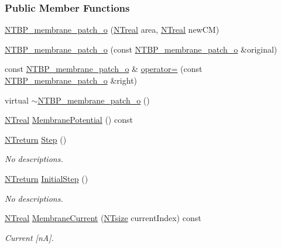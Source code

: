 \subsubsection*{Public Member Functions}
\begin{DoxyCompactItemize}
\item 
\hyperlink{class_n_t_b_p__membrane__patch__o_a47ed0ce9975ece138516bbd0836abba6}{NTBP\_\-membrane\_\-patch\_\-o} (\hyperlink{nt__types_8h_a814a97893e9deb1eedcc7604529ba80d}{NTreal} area, \hyperlink{nt__types_8h_a814a97893e9deb1eedcc7604529ba80d}{NTreal} newCM)
\item 
\hyperlink{class_n_t_b_p__membrane__patch__o_aa49f1f6f1aa0ce86dc25015b963a3da1}{NTBP\_\-membrane\_\-patch\_\-o} (const \hyperlink{class_n_t_b_p__membrane__patch__o}{NTBP\_\-membrane\_\-patch\_\-o} \&original)
\item 
const \hyperlink{class_n_t_b_p__membrane__patch__o}{NTBP\_\-membrane\_\-patch\_\-o} \& \hyperlink{class_n_t_b_p__membrane__patch__o_a6f386776c4bceff4311079c95685e762}{operator=} (const \hyperlink{class_n_t_b_p__membrane__patch__o}{NTBP\_\-membrane\_\-patch\_\-o} \&right)
\item 
virtual \hyperlink{class_n_t_b_p__membrane__patch__o_a879df23db2f57698db3d9854910a851b}{$\sim$NTBP\_\-membrane\_\-patch\_\-o} ()
\item 
\hyperlink{nt__types_8h_a814a97893e9deb1eedcc7604529ba80d}{NTreal} \hyperlink{class_n_t_b_p__membrane__patch__o_a9692bff4acbd0b1e7468a338620bd5d0}{MembranePotential} () const 
\item 
\hyperlink{nt__types_8h_ab9564ee8f091e809d21b8451c6683c53}{NTreturn} \hyperlink{class_n_t_b_p__membrane__patch__o_ae252091e5326872bbc9cbe5a9879d038}{Step} ()
\begin{DoxyCompactList}\small\item\em No descriptions. \item\end{DoxyCompactList}\item 
\hyperlink{nt__types_8h_ab9564ee8f091e809d21b8451c6683c53}{NTreturn} \hyperlink{class_n_t_b_p__membrane__patch__o_ad5cace8fa192ba9d441577b618e3bc8a}{InitialStep} ()
\begin{DoxyCompactList}\small\item\em No descriptions. \item\end{DoxyCompactList}\item 
\hyperlink{nt__types_8h_a814a97893e9deb1eedcc7604529ba80d}{NTreal} \hyperlink{class_n_t_b_p__membrane__patch__o_afedc8b1be48795429a72a18756c75fa5}{MembraneCurrent} (\hyperlink{nt__types_8h_a06c124f2e4469769b58230253ce0560b}{NTsize} currentIndex) const 
\begin{DoxyCompactList}\small\item\em Current \mbox{[}nA\mbox{]}. \item\end{DoxyCompactList}\end{DoxyCompactItemize}


